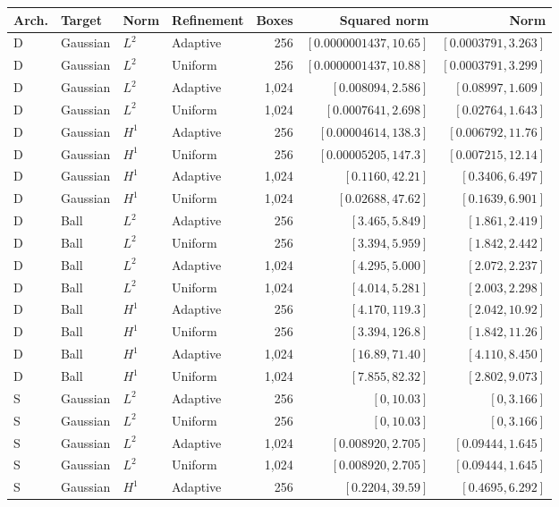 \begin{longtable}{@{}llllrrr@{}}
\toprule
Arch. & Target & Norm & Refinement & Boxes & Squared norm & Norm \\
\midrule
\endhead
D & Gaussian & $L^2$ & Adaptive & 256 & $[0.0000001437,10.65]$ & $[0.0003791,3.263]$ \\
D & Gaussian & $L^2$ & Uniform & 256 & $[0.0000001437,10.88]$ & $[0.0003791,3.299]$ \\
D & Gaussian & $L^2$ & Adaptive & 1,024 & $[0.008094,2.586]$ & $[0.08997,1.609]$ \\
D & Gaussian & $L^2$ & Uniform & 1,024 & $[0.0007641,2.698]$ & $[0.02764,1.643]$ \\
D & Gaussian & $H^1$ & Adaptive & 256 & $[0.00004614,138.3]$ & $[0.006792,11.76]$ \\
D & Gaussian & $H^1$ & Uniform & 256 & $[0.00005205,147.3]$ & $[0.007215,12.14]$ \\
D & Gaussian & $H^1$ & Adaptive & 1,024 & $[0.1160,42.21]$ & $[0.3406,6.497]$ \\
D & Gaussian & $H^1$ & Uniform & 1,024 & $[0.02688,47.62]$ & $[0.1639,6.901]$ \\
D & Ball & $L^2$ & Adaptive & 256 & $[3.465,5.849]$ & $[1.861,2.419]$ \\
D & Ball & $L^2$ & Uniform & 256 & $[3.394,5.959]$ & $[1.842,2.442]$ \\
D & Ball & $L^2$ & Adaptive & 1,024 & $[4.295,5.000]$ & $[2.072,2.237]$ \\
D & Ball & $L^2$ & Uniform & 1,024 & $[4.014,5.281]$ & $[2.003,2.298]$ \\
D & Ball & $H^1$ & Adaptive & 256 & $[4.170,119.3]$ & $[2.042,10.92]$ \\
D & Ball & $H^1$ & Uniform & 256 & $[3.394,126.8]$ & $[1.842,11.26]$ \\
D & Ball & $H^1$ & Adaptive & 1,024 & $[16.89,71.40]$ & $[4.110,8.450]$ \\
D & Ball & $H^1$ & Uniform & 1,024 & $[7.855,82.32]$ & $[2.802,9.073]$ \\
S & Gaussian & $L^2$ & Adaptive & 256 & $[0,10.03]$ & $[0,3.166]$ \\
S & Gaussian & $L^2$ & Uniform & 256 & $[0,10.03]$ & $[0,3.166]$ \\
S & Gaussian & $L^2$ & Adaptive & 1,024 & $[0.008920,2.705]$ & $[0.09444,1.645]$ \\
S & Gaussian & $L^2$ & Uniform & 1,024 & $[0.008920,2.705]$ & $[0.09444,1.645]$ \\
S & Gaussian & $H^1$ & Adaptive & 256 & $[0.2204,39.59]$ & $[0.4695,6.292]$ \\

\end{longtable}
